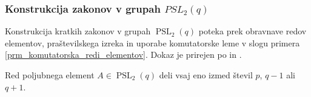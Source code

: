 
    \subsubsection{Konstrukcija zakonov v grupah $PSL_2(q)$}

    Konstrukcija kratkih zakonov v grupah $\operatorname{PSL}_2(q)$ poteka prek obravnave redov elementov, praštevilskega izreka in uporabe komutatorske leme v slogu primera \ref{prm_komutatorska_redi_elementov}.
    Dokaz je prirejen po \cite[str.~36--37]{Schneider_2016} in \cite{Jezernik_2023}.
    \begin{lema}
    \label{lem_redi_elementov_v_psl2q}
    Red poljubnega element $A \in  \operatorname{PSL}_2(q)$ deli vsaj eno izmed števil $p$, $q-1$ ali $q + 1$. 
    \end{lema}
